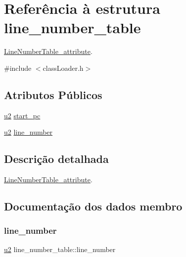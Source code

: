 \hypertarget{structline__number__table}{}\section{Referência à estrutura line\+\_\+number\+\_\+table}
\label{structline__number__table}


\hyperlink{struct_line_number_table__attribute}{Line\+Number\+Table\+\_\+attribute}.  




{\ttfamily \#include $<$class\+Loader.\+h$>$}

\subsection*{Atributos Públicos}
\begin{DoxyCompactItemize}
\item 
\hyperlink{util_8h_a55ef8d87fd202b8417704c089899c5b9}{u2} \hyperlink{structline__number__table_a6b2853f752039f060c94612f910f6fa0}{start\+\_\+pc}
\item 
\hyperlink{util_8h_a55ef8d87fd202b8417704c089899c5b9}{u2} \hyperlink{structline__number__table_a439fd012fa7278b2adf751ada8ff9b1b}{line\+\_\+number}
\end{DoxyCompactItemize}


\subsection{Descrição detalhada}
\hyperlink{struct_line_number_table__attribute}{Line\+Number\+Table\+\_\+attribute}. 

\subsection{Documentação dos dados membro}
\mbox{\label{structline__number__table_a439fd012fa7278b2adf751ada8ff9b1b}} 
\subsubsection{\texorpdfstring{line\+\_\+number}{line\_number}}
{\footnotesize\ttfamily \hyperlink{util_8h_a55ef8d87fd202b8417704c089899c5b9}{u2} line\+\_\+number\+\_\+table\+::line\+\_\+number}

